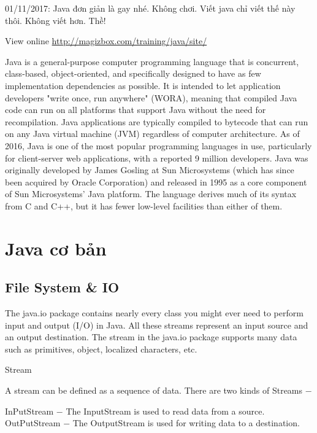 01/11/2017: Java đơn giản là gay nhé. Không chơi. Viết java chỉ viết thế này thôi. Không viết hơn. Thề!

View online \href{http://magizbox.com/training/java/site/}{http://magizbox.com/training/java/site/}

Java is a general-purpose computer programming language that is concurrent, class-based, object-oriented, and specifically designed to have as few implementation dependencies as possible. It is intended to let application developers "write once, run anywhere" (WORA), meaning that compiled Java code can run on all platforms that support Java without the need for recompilation. Java applications are typically compiled to bytecode that can run on any Java virtual machine (JVM) regardless of computer architecture. As of 2016, Java is one of the most popular programming languages in use, particularly for client-server web applications, with a reported 9 million developers. Java was originally developed by James Gosling at Sun Microsystems (which has since been acquired by Oracle Corporation) and released in 1995 as a core component of Sun Microsystems' Java platform. The language derives much of its syntax from C and C++, but it has fewer low-level facilities than either of them.


\part{Java cơ bản}






\chapter{File System & IO}

The java.io package contains nearly every class you might ever need to perform input and output (I/O) in Java. All these streams represent an input source and an output destination. The stream in the java.io package supports many data such as primitives, object, localized characters, etc.

Stream

A stream can be defined as a sequence of data. There are two kinds of Streams −

InPutStream − The InputStream is used to read data from a source.
OutPutStream − The OutputStream is used for writing data to a destination.


